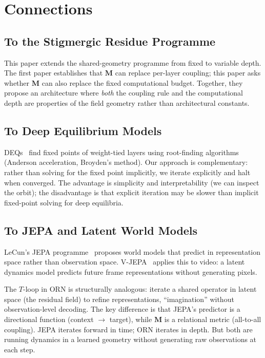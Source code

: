 \documentclass[11pt, a4paper]{article}
\newcommand{\M}{\mathbf{M}}
\theoremstyle{plain}
\theoremstyle{definition}
\theoremstyle{remark}
\begin{document}
\section{Connections}

\subsection{To the Stigmergic Residue Programme}

This paper extends the shared-geometry programme from fixed to variable depth.
The first paper establishes that $\M$ can replace per-layer coupling; this paper asks whether $\M$ can also replace the fixed computational budget.
Together, they propose an architecture where \emph{both} the coupling rule and the computational depth are properties of the field geometry rather than architectural constants.

\subsection{To Deep Equilibrium Models}

DEQs~\cite{bai2019deep} find fixed points of weight-tied layers using root-finding algorithms (Anderson acceleration, Broyden's method).
Our approach is complementary: rather than solving for the fixed point implicitly, we iterate explicitly and halt when converged.
The advantage is simplicity and interpretability (we can inspect the orbit); the disadvantage is that explicit iteration may be slower than implicit fixed-point solving for deep equilibria.

\subsection{To JEPA and Latent World Models}

LeCun's JEPA programme~\cite{lecun2022jepa} proposes world models that predict in representation space rather than observation space.
V-JEPA~\cite{bardes2024vjepa} applies this to video: a latent dynamics model predicts future frame representations without generating pixels.

The $T$-loop in ORN is structurally analogous: iterate a shared operator in latent space (the residual field) to refine representations, ``imagination'' without observation-level decoding.
The key difference is that JEPA's predictor is a directional function (context $\to$ target), while $\M$ is a relational metric (all-to-all coupling).
JEPA iterates forward in time; ORN iterates in depth.
But both are running dynamics in a learned geometry without generating raw observations at each step.
\end{document}
